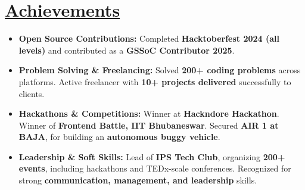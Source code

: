 \documentclass[a4paper,12pt]{article}
\begin{document}
\section{\underline{Achievements}}

\begin{itemize}
    \item \textbf{Open Source Contributions:}  
    Completed \textbf{Hacktoberfest 2024 (all levels)} and contributed as a \textbf{GSSoC Contributor 2025}.  

    \item \textbf{Problem Solving \& Freelancing:}  
    Solved \textbf{200+ coding problems} across platforms. Active freelancer with \textbf{10+ projects delivered} successfully to clients.  

    \item \textbf{Hackathons \& Competitions:}  
    Winner at \textbf{Hackndore Hackathon}.  
    Winner of \textbf{Frontend Battle, IIT Bhubaneswar}.  
    Secured \textbf{AIR 1 at BAJA}, for building an \textbf{autonomous buggy vehicle}.  

    \item \textbf{Leadership \& Soft Skills:}  
    Lead of \textbf{IPS Tech Club}, organizing \textbf{200+ events}, including hackathons and TEDx-scale conferences. Recognized for strong \textbf{communication, management, and leadership} skills.  
\end{itemize}
\end{document}
